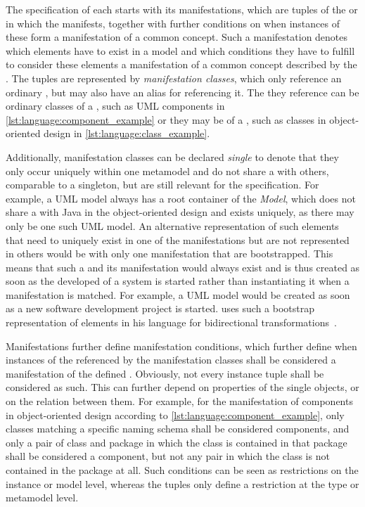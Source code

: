 The specification of each \commonality starts with its manifestations, which are \metaclass tuples of the \concretemetamodels or \conceptmetamodels in which the \commonality manifests, together with further conditions on when instances of these \metaclasses form a manifestation of a common concept.
Such a manifestation denotes which elements have to exist in a model and which conditions they have to fulfill to consider these elements a manifestation of a common concept described by the \commonality.
The \metaclass tuples are represented by \emph{manifestation classes}, which only reference an ordinary \metaclass, but may also have an alias for referencing it.
The \metaclass they reference can be ordinary classes of a \concretemetamodels, such as \gls{UML} components in \autoref{lst:language:component_example} or they may be \commonalities of a \conceptmetamodel, such as classes in object-oriented design in \autoref{lst:language:class_example}.

Additionally, manifestation classes can be declared \emph{single} to denote that they only occur uniquely within one metamodel and do not share a \commonality with others, comparable to a singleton, but are still relevant for the \commonalities specification.
For example, a \gls{UML} model always has a root container of the \metaclass \emph{Model}, which does not share a \commonality with Java in the object-oriented design \conceptmetamodel and exists uniquely, as there may only be one such \gls{UML} model.
An alternative representation of such elements that need to uniquely exist in one of the manifestations but are not represented in others would be \commonalities with only one manifestation that are bootstrapped.
This means that such a \commonality and its manifestation would always exist and is thus created as soon as the developed of a system is started rather than instantiating it when a manifestation is matched.
For example, a \gls{UML} model would be created as soon as a new software development project is started.
\citeauthor{kramer2017a} uses such a bootstrap representation of elements in his \mappings language for bidirectional transformations~\cite[Sec. 7.1]{kramer2017a}.

Manifestations further define manifestation conditions, which further define when instances of the \metaclasses referenced by the manifestation classes shall be considered a manifestation of the defined \commonality.
Obviously, not every instance tuple shall be considered as such.
This can further depend on properties of the single objects, or on the relation between them.
For example, for the manifestation of components in object-oriented design according to \autoref{lst:language:component_example}, only classes matching a specific naming schema shall be considered components, and only a pair of class and package in which the class is contained in that package shall be considered a component, but not any pair in which the class is not contained in the package at all.
Such conditions can be seen as restrictions on the instance or model level, whereas the \metaclass tuples only define a restriction at the type or metamodel level.

